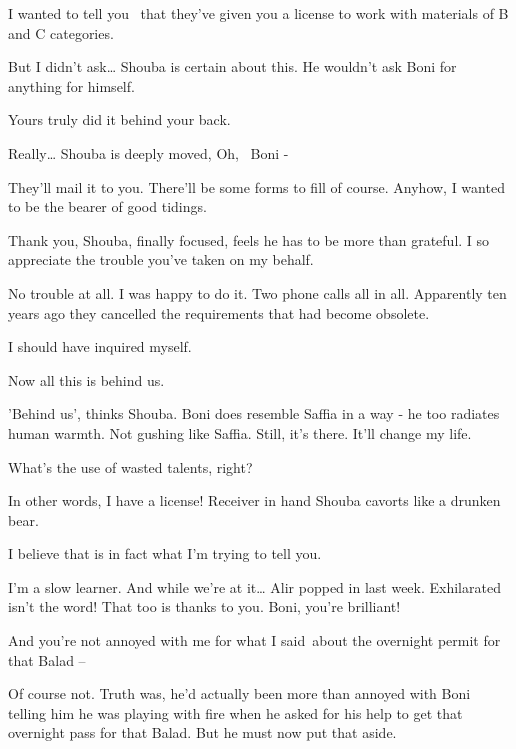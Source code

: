 \documentclass[letterpaper]{article}
\begin{document}
{\textquotedbl}I wanted to tell you \ that they've given you a license to work with materials of B and C
categories.{\textquotedbl} 

{\textquotedbl}But I didn't ask{\dots}{\textquotedbl} Shouba is certain about this. He wouldn't ask Boni for anything
for himself. 

{\textquotedbl}Yours truly did it behind your back.{\textquotedbl} 

{\textquotedbl}Really{\dots}{\textquotedbl} Shouba is deeply moved, {\textquotedbl}Oh, ~Boni -{\textquotedbl} 

{\textquotedbl}They'll mail it to you. There'll be some forms to fill of course. Anyhow, I wanted to be the bearer of
good tidings.{\textquotedbl} 

{\textquotedbl}Thank you,{\textquotedbl} Shouba, finally focused, feels he has to be more than grateful.
{\textquotedbl}I so appreciate the trouble you've taken on my behalf.{\textquotedbl} 

{\textquotedbl}No trouble at all. I was happy to do it. Two phone calls all in all. Apparently ten years ago they
cancelled the requirements that had become obsolete.{\textquotedbl} 

{\textquotedbl}I should have inquired myself.{\textquotedbl} 

{\textquotedbl}Now all this is behind us.{\textquotedbl} 

{}'Behind us', thinks Shouba. Boni does resemble Saffia in a way - he too radiates human warmth. Not gushing like
Saffia. Still, it's there. {\textquotedbl}It'll change my life.{\textquotedbl} 

{\textquotedbl}What's the use of wasted talents, right?{\textquotedbl} 

{\textquotedbl}In other words, I have a license!{\textquotedbl} Receiver in hand Shouba cavorts like a drunken bear. 

{\textquotedbl}I believe that is in fact what I'm trying to tell you.{\textquotedbl} 

{\textquotedbl}I'm a slow learner. And while we're at it{\dots} Alir popped in last week. Exhilarated isn't the word!
That too is thanks to you. Boni, you're brilliant!{\textquotedbl} 

{\textquotedbl}And you're not annoyed with me for what I said~about the overnight permit for that Balad
--{\textquotedbl} 

{\textquotedbl}Of course not.{\textquotedbl} Truth\textcolor{red}{ }was, he'd actually been more than annoyed with Boni
telling him he was playing with fire when he asked for his help to get that overnight pass for that\textcolor{red}{
}Balad. But he must now put that aside. 
\end{document}
